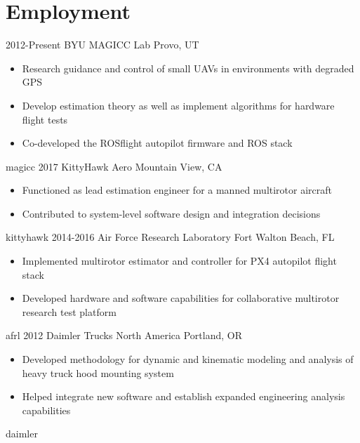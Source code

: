 

\section{Employment}

\begin{entrylist}
\logoentry
{2012-Present}
{BYU MAGICC Lab}
{Provo, UT}
{
\begin{itemize}
	\item Research guidance and control of small UAVs in environments with degraded GPS
	\item Develop estimation theory as well as implement algorithms for hardware flight tests
	\item Co-developed the ROSflight autopilot firmware and ROS stack
\end{itemize}
}
{magicc}
\logoentry
{2017}
{KittyHawk Aero}
{Mountain View, CA}
{
\begin{itemize}
	\item Functioned as lead estimation engineer for a manned multirotor aircraft
	\item Contributed to system-level software design and integration decisions
\end{itemize}
}
{kittyhawk}
\logoentry
{2014-2016}
{Air Force Research Laboratory}
{Fort Walton Beach, FL}
{
\begin{itemize}
	\item Implemented multirotor estimator and controller for PX4 autopilot flight stack
	\item Developed hardware and software capabilities for collaborative multirotor research test platform
\end{itemize}
}
{afrl}
\logoentry
{2012}
{Daimler Trucks North America}
{Portland, OR}
{
\begin{itemize}
	\item Developed methodology for dynamic and kinematic modeling and analysis of heavy truck hood mounting system
	\item Helped integrate new software and establish expanded engineering analysis capabilities
\end{itemize}
}
{daimler}

\end{entrylist}
